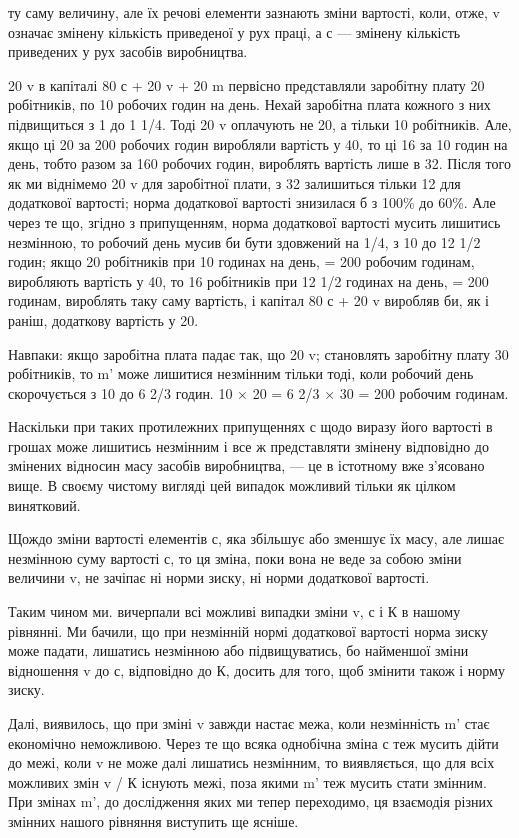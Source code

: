 ту саму величину, але їх речові елементи зазнають зміни вартості,
коли, отже, v означає змінену кількість приведеної у рух
праці, а с — змінену кількість приведених у рух засобів виробництва.

20 v в капіталі 80 с + 20 v + 20 m первісно представляли заробітну
плату 20 робітників, по 10 робочих годин на день. Нехай
заробітна плата кожного з них підвищиться з 1 до 1 1/4. Тоді 20 v
оплачують не 20, а тільки 10 робітників. Але, якщо ці 20 за
200 робочих годин виробляли вартість у 40, то ці 16 за 10 годин
на день, тобто разом за 160 робочих годин, вироблять вартість
лише в 32. Після того як ми віднімемо 20 v для заробітної
плати, з 32 залишиться тільки 12 для додаткової вартості; норма
додаткової вартості знизилася б з 100\% до 60\%. Але через
те що, згідно з припущенням, норма додаткової вартості мусить
лишитись незмінною, то робочий день мусив би бути здовжений
на 1/4, з 10 до 12 1/2 годин; якщо 20 робітників при 10 годинах
на день, = 200 робочим годинам, виробляють вартість у 40, то
16 робітників при 12 1/2 годинах на день, = 200 годинам, вироблять
таку саму вартість, і капітал 80 с + 20 v виробляв би, як і раніш,
додаткову вартість у 20.

Навпаки: якщо заробітна плата падає так, що 20 v; становлять
заробітну плату 30 робітників, то m' може лишитися
незмінним тільки тоді, коли робочий день скорочується з 10
до 6 2/3 годин. 10 × 20 = 6 2/3 × 30 = 200 робочим годинам.

Наскільки при таких протилежних припущеннях с щодо виразу
його вартості в грошах може лишитись незмінним і все ж
представляти змінену відповідно до змінених відносин масу
засобів виробництва, — це в істотному вже з’ясовано вище.
В своєму чистому вигляді цей випадок можливий тільки як цілком
винятковий.

Щождо зміни вартості елементів с, яка збільшує або зменшує
їх масу, але лишає незмінною суму вартості с, то ця зміна, поки
вона не веде за собою зміни величини v, не зачіпає ні норми
зиску, ні норми додаткової вартості.

Таким чином ми. вичерпали всі можливі випадки зміни v, с
і К в нашому рівнянні. Ми бачили, що при незмінній нормі додаткової
вартості норма зиску може падати, лишатись незмінною
або підвищуватись, бо найменшої зміни відношення v до с,
відповідно до К, досить для того, щоб змінити також і норму
зиску.

Далі, виявилось, що при зміні v завжди настає межа, коли незмінність
m' стає економічно неможливою. Через те що всяка
однобічна зміна с теж мусить дійти до межі, коли v не може
далі лишатись незмінним, то виявляється, що для всіх можливих
змін v / К існують межі, поза якими m' теж мусить стати змінним.
При змінах m', до дослідження яких ми тепер переходимо, ця
взаємодія різних змінних нашого рівняння виступить ще ясніше.
